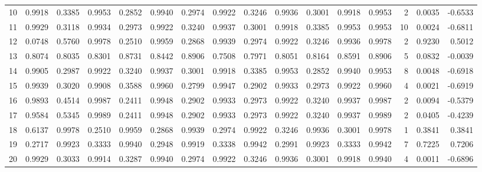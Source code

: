\begin{tabular}{lrrrrrrrrrrrrrrr}
10  &      0.9918 &  0.3385 &  0.9953 &  0.2852 &  0.9940 &  0.2974 &  0.9922 &  0.3246 &  0.9936 &  0.3001 &   0.9918 &     0.9953 &      2 &                    0.0035 &                    -0.6533 \\
11  &      0.9929 &  0.3118 &  0.9934 &  0.2973 &  0.9922 &  0.3240 &  0.9937 &  0.3001 &  0.9918 &  0.3385 &   0.9953 &     0.9953 &     10 &                    0.0024 &                    -0.6811 \\
12  &      0.0748 &  0.5760 &  0.9978 &  0.2510 &  0.9959 &  0.2868 &  0.9939 &  0.2974 &  0.9922 &  0.3246 &   0.9936 &     0.9978 &      2 &                    0.9230 &                     0.5012 \\
13  &      0.8074 &  0.8035 &  0.8301 &  0.8731 &  0.8442 &  0.8906 &  0.7508 &  0.7971 &  0.8051 &  0.8164 &   0.8591 &     0.8906 &      5 &                    0.0832 &                    -0.0039 \\
14  &      0.9905 &  0.2987 &  0.9922 &  0.3240 &  0.9937 &  0.3001 &  0.9918 &  0.3385 &  0.9953 &  0.2852 &   0.9940 &     0.9953 &      8 &                    0.0048 &                    -0.6918 \\
15  &      0.9939 &  0.3020 &  0.9908 &  0.3588 &  0.9960 &  0.2799 &  0.9947 &  0.2902 &  0.9933 &  0.2973 &   0.9922 &     0.9960 &      4 &                    0.0021 &                    -0.6919 \\
16  &      0.9893 &  0.4514 &  0.9987 &  0.2411 &  0.9948 &  0.2902 &  0.9933 &  0.2973 &  0.9922 &  0.3240 &   0.9937 &     0.9987 &      2 &                    0.0094 &                    -0.5379 \\
17  &      0.9584 &  0.5345 &  0.9989 &  0.2411 &  0.9948 &  0.2902 &  0.9933 &  0.2973 &  0.9922 &  0.3240 &   0.9937 &     0.9989 &      2 &                    0.0405 &                    -0.4239 \\
18  &      0.6137 &  0.9978 &  0.2510 &  0.9959 &  0.2868 &  0.9939 &  0.2974 &  0.9922 &  0.3246 &  0.9936 &   0.3001 &     0.9978 &      1 &                    0.3841 &                     0.3841 \\
19  &      0.2717 &  0.9923 &  0.3333 &  0.9940 &  0.2948 &  0.9919 &  0.3338 &  0.9942 &  0.2991 &  0.9923 &   0.3333 &     0.9942 &      7 &                    0.7225 &                     0.7206 \\
20  &      0.9929 &  0.3033 &  0.9914 &  0.3287 &  0.9940 &  0.2974 &  0.9922 &  0.3246 &  0.9936 &  0.3001 &   0.9918 &     0.9940 &      4 &                    0.0011 &                    -0.6896 \\

\end{tabular}

